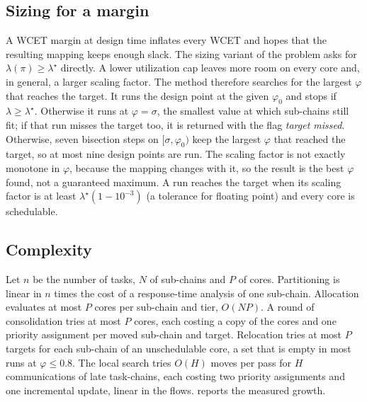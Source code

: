\subsection{Sizing for a margin}
\label{sec:sizing}

A WCET margin at design time inflates every WCET and hopes that the
resulting mapping keeps enough slack. The sizing variant of the problem
asks for $\lambda(\pi)\ge\lambda^\star$ directly. A lower utilization cap
leaves more room on every core and, in general, a larger scaling factor.
The method therefore searches for the largest $\varphi$ that reaches the
target. It runs the design point at the given $\varphi_0$ and stops if
$\lambda\ge\lambda^\star$. Otherwise it runs at $\varphi=\sigma$, the
smallest value at which sub-chains still fit; if that run misses the target
too, it is returned with the flag \emph{target missed}. Otherwise, seven
bisection steps on $[\sigma,\varphi_0)$ keep the largest $\varphi$ that
reached the target, so at most nine design points are run. The scaling
factor is not exactly monotone in $\varphi$, because the mapping changes
with it, so the result is the best $\varphi$ found, not a guaranteed
maximum. A run reaches the target when its scaling factor is at least
$\lambda^\star(1-10^{-3})$ (a tolerance for floating point) and every core
is schedulable.

\subsection{Complexity}

Let $n$ be the number of tasks, $N$ of sub-chains and $P$ of cores.
Partitioning is linear in $n$ times the cost of a response-time analysis
of one sub-chain. Allocation evaluates at most $P$ cores per sub-chain and
tier, $O(NP)$. A round of consolidation tries at most $P$ cores, each
costing a copy of the cores and one priority assignment per moved
sub-chain and target. Relocation tries at most $P$ targets for each
sub-chain of an unschedulable core, a set that is empty in most runs at
$\varphi\le0.8$. The
local search tries $O(H)$ moves per pass for $H$ communications of late
task-chains, each costing two priority assignments and one incremental
update, linear in the flows.  reports the measured
growth.
